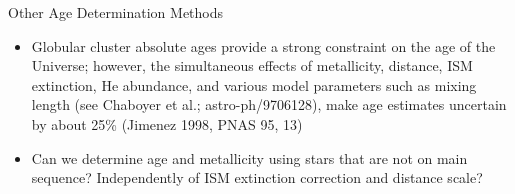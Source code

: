 \documentclass[letterpaper,landscape]{slides}
\begin{document}
\begin{slide}
{\begin{minipage}[t]{10cm}
\begin{center}
\end{center}
\end{minipage}

\begin{minipage}[t]{13cm}
\begin{center}
\vskip -1in
{\large \color{red} Other Age Determination Methods }
\end{center}


\begin{itemize}
\item {\color{blue} Globular cluster absolute ages provide a strong 
   constraint on the age of the Universe;} however, the 
   simultaneous effects of metallicity, distance, ISM extinction, 
   He abundance, and various model parameters such as mixing length 
   (see Chaboyer et al.; astro-ph/9706128), make age estimates
   uncertain by about 25\% (Jimenez 1998, PNAS 95, 13) 
\item Can we determine age and metallicity using stars that are 
   not on main sequence? Independently of ISM extinction
   correction and distance scale? 
\end{itemize}

\end{minipage}}
\vfill 
\end{slide}
\end{document}
